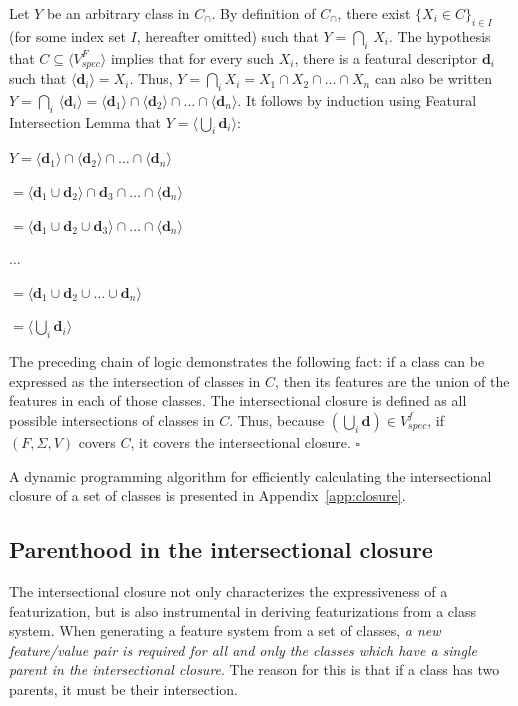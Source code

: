 \documentclass[12pt, oneside]{article}   	%
\begin{document}
Let $Y$ be an arbitrary class in $C_\cap$. By definition of $C_\cap$, there exist $\{X_i \in C\}_{i \in I}$ (for some index set $I$, hereafter omitted) such that $Y = \bigcap_i \, X_i$. The hypothesis that $C \subseteq \langle V_{spec}^F \rangle $ implies that for every such $X_i$, there is a featural descriptor $\mathbf{d}_i$ such that $\langle \mathbf{d}_i \rangle = X_i$. Thus, $Y = \bigcap_i X_i = X_1 \cap X_2 \cap \ldots \cap X_n$ can also be written $Y = \bigcap_i \, \langle \mathbf{d}_i \rangle = \langle \mathbf{d}_1 \rangle \cap \langle \mathbf{d}_2 \rangle \cap \ldots \cap \langle \mathbf{d}_n \rangle$. It follows by induction using Featural Intersection Lemma that $Y = \langle \bigcup_i \mathbf{d}_i \rangle$:

$Y = \langle \mathbf{d}_1 \rangle \cap  \langle \mathbf{d}_2 \rangle \cap \ldots \cap  \langle \mathbf{d}_n \rangle$

\quad $ = \langle \mathbf{d}_1 \cup \mathbf{d}_2 \rangle \cap \mathbf{d}_3 \cap \ldots \cap \langle \mathbf{d}_n \rangle$

\quad $ = \langle \mathbf{d}_1 \cup \mathbf{d}_2 \cup \mathbf{d}_3 \rangle \cap \ldots \cap \langle \mathbf{d}_n \rangle$

\quad $\ldots$

\quad $= \langle \mathbf{d}_1 \cup \mathbf{d}_2 \cup \ldots \cup \mathbf{d}_n \rangle$

\quad $= \langle \bigcup_i  \mathbf{d}_i \rangle$

\noindent The preceding chain of logic demonstrates the following fact: if a class can be expressed as the intersection of classes in $C$, then its features are the union of the features in each of those classes. The intersectional closure is defined as all possible intersections of classes in $C$. Thus, because $(\bigcup_i \mathbf{d}) \in V_{spec}^f$, if $(F, \Sigma, V)$ covers $C$, it covers the intersectional closure. $\square$

\vspace{0.5\baselineskip} A dynamic programming algorithm for efficiently calculating the intersectional closure of a set of classes is presented in Appendix~\ref{app:closure}.

\subsection{Parenthood in the intersectional closure}
\label{sec:intersection_proof}

The intersectional closure not only characterizes the expressiveness of a featurization, but is also instrumental in deriving featurizations from a class system. When generating a feature system from a set of classes, \textit{a new feature/value pair is required for all and only the classes which have a single parent in the intersectional closure}. The reason for this is that if a class has two parents, it must be their intersection.
\end{document}
